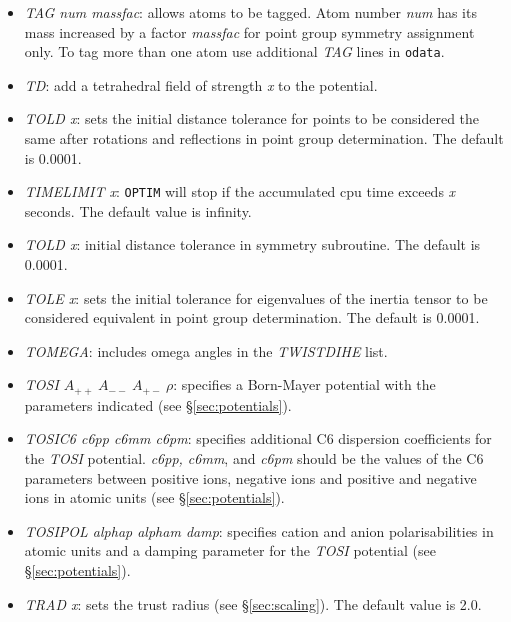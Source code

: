 \documentclass[12pt,a4paper,dvips]{article}
\begin{document}
\begin{itemize}
\item {\it TAG num massfac\/}:
allows atoms to be tagged. Atom number {\it num\/} has its mass increased
by a factor {\it massfac\/} for point group symmetry assignment only.
To tag more than one atom use additional {\it TAG\/} lines in {\tt odata}.

\item {\it TD\/}: add a tetrahedral field of strength {\it x} to the potential.

\item {\it TOLD x\/}: sets the initial distance tolerance for points
to be considered the same after rotations and reflections in point
group determination. The default is 0.0001.

\item {\it TIMELIMIT x\/}: {\tt OPTIM} will stop if the accumulated cpu
time exceeds {\it x} seconds. The default value is infinity.

\item {\it TOLD x\/}: initial distance tolerance in symmetry subroutine.
The default is 0.0001.

\item {\it TOLE x\/}: sets the initial tolerance for eigenvalues
of the inertia tensor to be considered equivalent in point
group determination. The default is 0.0001.

\item {\it TOMEGA\/}: includes omega angles in the {\it TWISTDIHE\/} list.

\item {\it TOSI $A_{++}\ A_{--}\ A_{+-}\ \rho$\/}: specifies a Born-Mayer potential
with the parameters indicated (see \S\ref{sec:potentials}).

\item {\it TOSIC6 c6pp c6mm c6pm\/}: specifies additional C6 dispersion coefficients
for the {\it TOSI\/} potential. {\it c6pp, c6mm\/}, and  {\it c6pm\/} should be the values of the C6
parameters between positive ions, negative ions and positive and negative ions in atomic units
(see \S\ref{sec:potentials}).

\item {\it TOSIPOL alphap alpham damp\/}: specifies cation and anion polarisabilities in atomic units
and a damping parameter for the {\it TOSI\/} potential (see \S\ref{sec:potentials}).

\item {\it TRAD x\/}: sets the trust radius (see \S\ref{sec:scaling}). The default value is 2.0.


\end{itemize}
\end{document}

